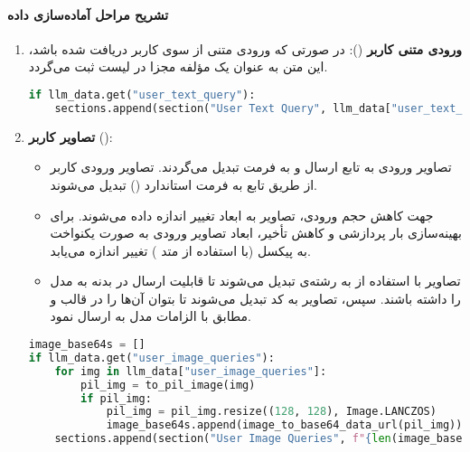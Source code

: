 \documentclass{article}
\begin{document}
\paragraph{تشریح مراحل آماده‌سازی داده}
\begin{enumerate}
    \item \textbf{ورودی متنی کاربر} ():
    در صورتی که ورودی متنی از سوی کاربر دریافت شده باشد، این متن به عنوان یک مؤلفه مجزا در لیست  ثبت می‌گردد.
    
    \begin{latin}
    \begin{lstlisting}[language=Python]
if llm_data.get("user_text_query"):
    sections.append(section("User Text Query", llm_data["user_text_query"]))
    \end{lstlisting}
    \end{latin}
    
    \item \textbf{تصاویر کاربر} ():
    \begin{itemize}
        \item تصاویر ورودی به تابع  ارسال و به فرمت  تبدیل می‌گردند.
        تصاویر ورودی کاربر از طریق تابع  به فرمت استاندارد  () تبدیل می‌شوند.
        
        \item جهت کاهش حجم ورودی، تصاویر به ابعاد  تغییر اندازه داده می‌شوند.
        برای بهینه‌سازی بار پردازشی و کاهش تأخیر، ابعاد تصاویر ورودی به صورت یکنواخت به  پیکسل (با استفاده از متد ) تغییر اندازه می‌یابد.
        
        \item تصاویر با استفاده از  به رشته‌ی  تبدیل می‌شوند تا قابلیت ارسال در بدنه  به مدل را داشته باشند.
        سپس، تصاویر به کد  تبدیل می‌شوند تا بتوان آن‌ها را در قالب  و مطابق با الزامات  مدل به  ارسال نمود.
    \end{itemize}
    
    \begin{latin}
    \begin{lstlisting}[language=Python]
image_base64s = []
if llm_data.get("user_image_queries"):
    for img in llm_data["user_image_queries"]:
        pil_img = to_pil_image(img)
        if pil_img:
            pil_img = pil_img.resize((128, 128), Image.LANCZOS)
            image_base64s.append(image_to_base64_data_url(pil_img))
    sections.append(section("User Image Queries", f"{len(image_base64s)} image(s) attached." if image_base64s else "<no usable images>"))
    \end{lstlisting}
    \end{latin}


\end{enumerate}
\end{document}
